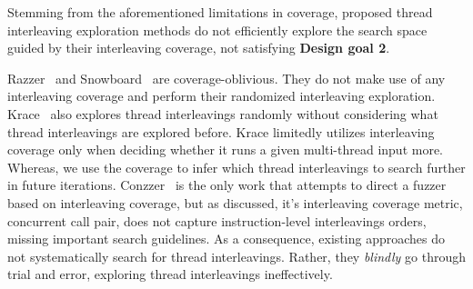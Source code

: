 







%
Stemming from the aforementioned limitations in coverage, proposed
thread interleaving exploration methods do not efficiently explore the
search space guided by their interleaving coverage, not satisfying
\textbf{Design goal 2}.

Razzer~\cite{razzer} and Snowboard~\cite{snowboard} are coverage-oblivious.
They do not make use of any interleaving coverage 
and perform their \dr{}randomized interleaving exploration.
%
Krace~\cite{krace} also explores thread interleavings randomly without
considering what thread interleavings are explored before.  Krace
limitedly utilizes interleaving coverage only when deciding whether it
runs a given multi-thread input more. Whereas, we use the coverage to
infer which thread interleavings to search further in future
iterations.
%
Conzzer~\cite{conzzer} is the only work that attempts to direct a
fuzzer based on interleaving coverage, but as discussed,  
it's interleaving coverage metric, concurrent call pair, does not capture instruction-level interleavings orders, missing important 
search guidelines.
%
As a consequence, existing approaches do not systematically search for
thread interleavings.  Rather, they \textit{blindly} go through
trial and error, exploring thread interleavings ineffectively.

